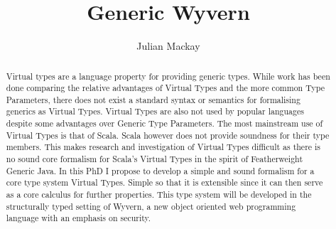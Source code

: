 \documentclass[11pt
              , a4paper
              , twoside
              , openright
              ]{report}
\title{Generic Wyvern}
\author{Julian Mackay}
\date{}
\begin{document}
\frontmatter



\begin{abstract}
Virtual types are a language property for providing generic types. While work has been done comparing the relative advantages of Virtual Types and the more common Type Parameters, there does not exist a standard syntax or semantics for formalising generics as Virtual Types. Virtual Types are also not used by popular languages despite some advantages over Generic Type Parameters. The most mainstream use of Virtual Types is that of Scala. Scala however does not provide soundness for their type members. This makes research and investigation of Virtual Types difficult as there is no sound core formalism for Scala's Virtual Types in the spirit of Featherweight Generic Java. In this PhD I propose to develop a simple and sound formalism for a core type system Virtual Types. Simple so that it is extensible since it can then serve as a core calculus for further properties. This type system will be developed in the structurally typed setting of Wyvern, a new object oriented web programming language with an emphasis on security.
\end{abstract}


\maketitle



\tableofcontents



\mainmatter


\end{document}
